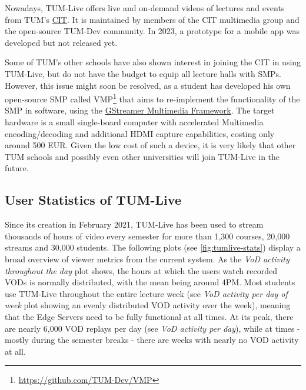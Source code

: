 Nowadays, TUM-Live offers live and on-demand videos of lectures and events from \ac{TUM}'s \href{https://www.cit.tum.de}{\ac{CIT}}\footnotemark[11]. It is maintained by members of the \ac{CIT} multimedia group and the open-source TUM-Dev community. In 2023, a prototype for a mobile app was developed but not released yet\footnotemark[12].

Some of \ac{TUM}'s other schools have also shown interest in joining the \ac{CIT} in using TUM-Live, but do not have the budget to equip all lecture halls with \ac{SMP}s. However, this issue might soon be resolved, as a student has developed his own open-source \ac{SMP} called \ac{VMP}\footnote{\url{https://github.com/TUM-Dev/VMP}} that aims to re-implement the functionality of the \ac{SMP} in software, using the \href{https://gstreamer.freedesktop.org}{GStreamer Multimedia Framework}\footnotemark[13]. The target hardware is a small single-board computer with accelerated Multimedia encoding/decoding and additional HDMI capture capabilities, costing only around 500 EUR. Given the low cost of such a device, it is very likely that other \ac{TUM} schools and possibly even other universities will join TUM-Live in the future.


\break
\subsection{User Statistics of TUM-Live}\label{subsection:user-stats-tumlive}

Since its creation in February 2021, TUM-Live has been used to stream thousands of hours of video every semester for more than 1,300 courses, 20,000 streams and 30,000 students. The following plots (see \autoref{fig:tumlive-stats}) display a broad overview of viewer metrics from the current system. As the \textit{VoD activity throughout the day} plot shows, the hours at which the users watch recorded \ac{VOD}s is normally distributed, with the mean being around 4PM. Most students use TUM-Live throughout the entire lecture week (see \textit{VoD activity per day of week} plot showing an evenly distributed \ac{VOD} activity over the week), meaning that the Edge Servers need to be fully functional at all times. At its peak, there are nearly 6,000 \ac{VOD} replays per day (see \textit{VoD activity per day}), while at times - mostly during the semester breaks - there are weeks with nearly no \ac{VOD} activity at all.

